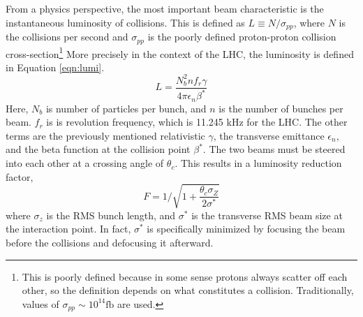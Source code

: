 From a physics perspective, the most important beam characteristic is the instantaneous luminosity of collisions.
This is defined as $L\equiv N/\sigma_{pp}$, where $N$ is the collisions per second and $\sigma_{pp}$ is the poorly defined proton-proton collision cross-section\footnote{This is poorly defined because in some sense protons always scatter off each other, so the definition depends on what constitutes a collision. Traditionally, values of $\sigma_{pp}\sim10^{14}\text{fb}$ are used.} \cite{lyndon}
More precisely in the context of the LHC, the luminosity is defined in Equation \ref{eqn:lumi}.\cite{lyndon}
\begin{equation}\label{eqn:lumi}
    L=\frac{N_b^2nf_r\gamma}{4\pi\epsilon_n\beta^*}
\end{equation}
Here, $N_b$ is number of particles per bunch, and $n$ is the number of bunches per beam.
$f_r$ is is revolution frequency, which is 11.245 kHz for the LHC.
The other terms are the previously mentioned relativistic $\gamma$, the transverse emittance $\epsilon_n$, and the beta function at the collision point $\beta^*$.
The two beams must be steered into each other at a crossing angle of $\theta_c$.
This results in a luminosity reduction factor,
\begin{equation}\label{eqn:lumiReduce}
    F=1/\sqrt{1+\frac{\theta_c\sigma_Z}{2\sigma^*}}
\end{equation}
where $\sigma_z$ is the RMS bunch length, and $\sigma^*$ is the transverse RMS beam size at the interaction point.
In fact, $\sigma^*$ is specifically minimized by focusing the beam before the collisions and defocusing it afterward.

